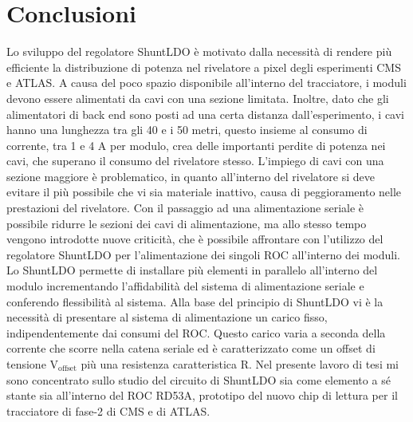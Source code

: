 \chapter{Conclusioni}


Lo sviluppo del regolatore ShuntLDO è motivato dalla necessità di rendere più efficiente la distribuzione di potenza nel rivelatore a pixel degli esperimenti CMS e ATLAS.
A causa del poco spazio disponibile all'interno del tracciatore, i moduli devono essere alimentati da cavi con una sezione limitata. Inoltre, dato che gli alimentatori di back end sono posti ad una certa distanza dall'esperimento, i cavi hanno una lunghezza tra gli 40 e i 50 metri, questo insieme al consumo di corrente, tra 1 e 4 A per modulo, crea delle importanti perdite di potenza nei cavi, che superano il consumo del rivelatore stesso. 
L'impiego di cavi con una sezione maggiore è problematico, in quanto all'interno del rivelatore si deve evitare il più possibile che vi sia materiale inattivo, causa di peggioramento nelle prestazioni del rivelatore. 
Con il passaggio ad una alimentazione seriale è possibile ridurre le sezioni dei cavi di alimentazione, ma allo stesso tempo vengono introdotte nuove criticità, che è possibile affrontare con l'utilizzo del regolatore ShuntLDO per l'alimentazione dei singoli ROC all'interno dei moduli.
Lo ShuntLDO permette di installare più elementi in parallelo all'interno del modulo incrementando  l'affidabilità del sistema di alimentazione seriale %
e conferendo  flessibilità al sistema. 
Alla base del principio di ShuntLDO vi è la necessità di presentare al sistema di alimentazione un carico fisso, indipendentemente dai consumi del ROC. 
Questo carico varia a seconda della corrente che scorre nella catena seriale ed è caratterizzato come un offset di tensione $\mathrm{V_{offset}}$ più una resistenza caratteristica R.
Nel presente lavoro di tesi mi sono concentrato sullo studio del circuito di ShuntLDO sia come elemento a sé stante sia all'interno del ROC RD53A, prototipo del nuovo chip di lettura per il tracciatore di fase-2 di CMS e di ATLAS. 

